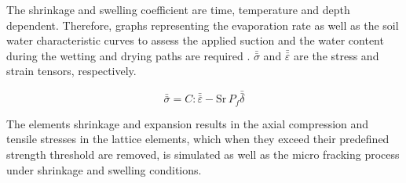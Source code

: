 The shrinkage and swelling coefficient are time, temperature and depth dependent. Therefore, graphs representing the evaporation rate as well as the soil water characteristic curves to assess the applied suction and the water content during the wetting and drying paths are required \cite{Voetal2017}. $\bar{\bar{\sigma}}$ and $\bar{\bar{\varepsilon}}$ are the stress and strain tensors, respectively. 

\begin{equation}
\label{eq:LEM_Shrinkage_3}
\bar{\bar{\sigma}} = C:\bar{\bar{\varepsilon}} - \text{Sr} \, P_f\bar{\bar{\delta}}
\end{equation}

The elements shrinkage and expansion results in the axial compression and tensile stresses in the lattice elements, which when they exceed their predefined strength threshold are removed, is simulated as well as the micro fracking process under shrinkage and swelling conditions.

